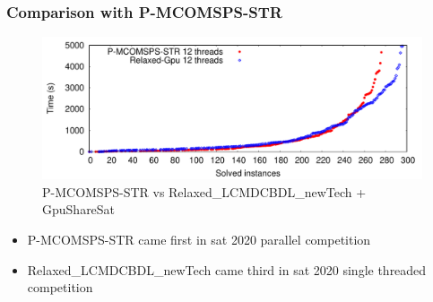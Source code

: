 \documentclass{beamer}
\begin{document}
\begin{frame}
\frametitle{Comparison with P-MCOMSPS-STR}
\begin{figure}[htb]
	\centering
	\includegraphics[width=\textwidth]{cactusplot_painless_vs_relaxed_gpu}
	\caption{P-MCOMSPS-STR vs Relaxed\_LCMDCBDL\_newTech + GpuShareSat}
	\label{cactus:relaxed}
\end{figure}
\begin{itemize}
\item P-MCOMSPS-STR came first in sat 2020 parallel competition
\item Relaxed\_LCMDCBDL\_newTech came third in sat 2020 single threaded competition
\end{itemize}
\end{frame}
\end{document}
